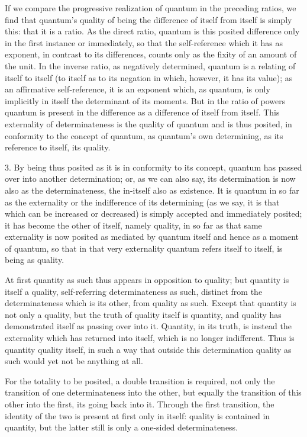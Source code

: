 If we compare the progressive realization
of quantum in the preceding ratios,
we find that quantum's quality of being
the difference of itself from itself is simply this:
that it is a ratio.
As the direct ratio, quantum is this posited difference
only in the first instance or immediately,
so that the self-reference which it has as exponent,
in contrast to its differences,
counts only as the fixity of an amount of the unit.
In the inverse ratio, as negatively determined,
quantum is a relating of itself to itself
(to itself as to its negation
in which, however, it has its value);
as an affirmative self-reference,
it is an exponent which, as quantum,
is only implicitly in itself the determinant of its moments.
But in the ratio of powers quantum is present
in the difference as a difference of itself from itself.
This externality of determinateness is
the quality of quantum and is thus posited,
in conformity to the concept of quantum,
as quantum's own determining,
as its reference to itself, its quality.

3. By being thus posited as it is in conformity to its concept,
quantum has passed over into another determination;
or, as we can also say, its determination is
now also as the determinateness,
the in-itself also as existence.
It is quantum in so far as the externality
or the indifference of its determining
(as we say, it is that which can be increased or decreased)
is simply accepted and immediately posited;
it has become the other of itself, namely quality,
in so far as that same externality is now posited
as mediated by quantum itself
and hence as a moment of quantum,
so that in that very externality
quantum refers itself to itself,
is being as quality.

At first quantity as such thus appears
in opposition to quality;
but quantity is itself a quality,
self-referring determinateness as such,
distinct from the determinateness which is its other,
from quality as such.
Except that quantity is not only a quality,
but the truth of quality itself is quantity,
and quality has demonstrated itself as passing over into it.
Quantity, in its truth, is instead the externality
which has returned into itself,
which is no longer indifferent.
Thus is quantity quality itself,
in such a way that outside this determination
quality as such would yet not be anything at all.

For the totality to be posited, a double transition is required,
not only the transition of one determinateness into the other,
but equally the transition of this other into the first,
its going back into it.
Through the first transition,
the identity of the two is present at first only in itself:
quality is contained in quantity,
but the latter still is only a one-sided determinateness.

